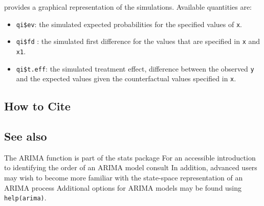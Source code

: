 \begin{itemize}
  provides a graphical representation of the simulations.  Available
  quantities are:
\begin{itemize}
\item {\tt qi\$ev}: the simulated expected probabilities for the
  specified values of {\tt x}.  
\item {\tt qi\$fd} : the simulated first difference for the values
  that are specified in {\tt x} and {\tt x1}.
\item{ \tt qi\$t.eff}: the simulated treatment effect, difference
between the observed {\tt y} and the expected values given the
counterfactual values specified in {\tt x}.     
\end{itemize}  
\end{itemize}


\subsection* {How to Cite} 




\subsection* {See also}

The ARIMA function is part of the stats package \citep{VenRip02}
For an accessible introduction to identifying the order of an ARIMA
model consult \cite{Enders04}
In addition, advanced users may wish to become more familiar with the state-space representation of an ARIMA process \citep{BroDav91}
Additional options for ARIMA models may be found using {\tt
help(arima)}.  
